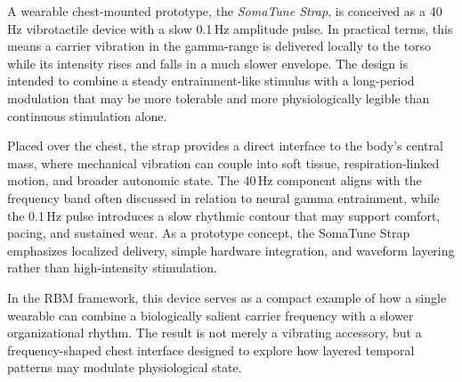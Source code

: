 A wearable chest-mounted prototype, the \emph{SomaTune Strap}, is conceived as a 40\,Hz vibrotactile device with a slow 0.1\,Hz amplitude pulse. In practical terms, this means a carrier vibration in the gamma-range is delivered locally to the torso while its intensity rises and falls in a much slower envelope. The design is intended to combine a steady entrainment-like stimulus with a long-period modulation that may be more tolerable and more physiologically legible than continuous stimulation alone.

Placed over the chest, the strap provides a direct interface to the body’s central mass, where mechanical vibration can couple into soft tissue, respiration-linked motion, and broader autonomic state. The 40\,Hz component aligns with the frequency band often discussed in relation to neural gamma entrainment, while the 0.1\,Hz pulse introduces a slow rhythmic contour that may support comfort, pacing, and sustained wear. As a prototype concept, the SomaTune Strap emphasizes localized delivery, simple hardware integration, and waveform layering rather than high-intensity stimulation.

In the RBM framework, this device serves as a compact example of how a single wearable can combine a biologically salient carrier frequency with a slower organizational rhythm. The result is not merely a vibrating accessory, but a frequency-shaped chest interface designed to explore how layered temporal patterns may modulate physiological state.
